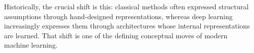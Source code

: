 \medskip

Historically, the crucial shift is this:
classical methods often expressed structural assumptions through hand-designed representations,
whereas deep learning increasingly expresses them through architectures whose internal representations are learned.
That shift is one of the defining conceptual moves of modern machine learning.
